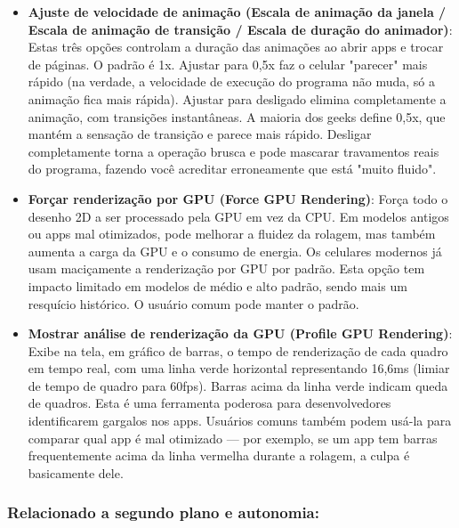 \begin{itemize}
  \item \textbf{Ajuste de velocidade de animação (Escala de animação da janela / Escala de animação de transição / Escala de duração do animador)}: Estas três opções controlam a duração das animações ao abrir apps e trocar de páginas. O padrão é 1x. Ajustar para 0,5x faz o celular "parecer" mais rápido (na verdade, a velocidade de execução do programa não muda, só a animação fica mais rápida). Ajustar para desligado elimina completamente a animação, com transições instantâneas. A maioria dos geeks define 0,5x, que mantém a sensação de transição e parece mais rápido. Desligar completamente torna a operação brusca e pode mascarar travamentos reais do programa, fazendo você acreditar erroneamente que está "muito fluido".
  \item \textbf{Forçar renderização por GPU (Force GPU Rendering)}: Força todo o desenho 2D a ser processado pela GPU em vez da CPU. Em modelos antigos ou apps mal otimizados, pode melhorar a fluidez da rolagem, mas também aumenta a carga da GPU e o consumo de energia. Os celulares modernos já usam maciçamente a renderização por GPU por padrão. Esta opção tem impacto limitado em modelos de médio e alto padrão, sendo mais um resquício histórico. O usuário comum pode manter o padrão.
  \item \textbf{Mostrar análise de renderização da GPU (Profile GPU Rendering)}: Exibe na tela, em gráfico de barras, o tempo de renderização de cada quadro em tempo real, com uma linha verde horizontal representando 16,6ms (limiar de tempo de quadro para 60fps). Barras acima da linha verde indicam queda de quadros. Esta é uma ferramenta poderosa para desenvolvedores identificarem gargalos nos apps. Usuários comuns também podem usá-la para comparar qual app é mal otimizado — por exemplo, se um app tem barras frequentemente acima da linha vermelha durante a rolagem, a culpa é basicamente dele.
\end{itemize}

\subsubsection*{Relacionado a segundo plano e autonomia:}


